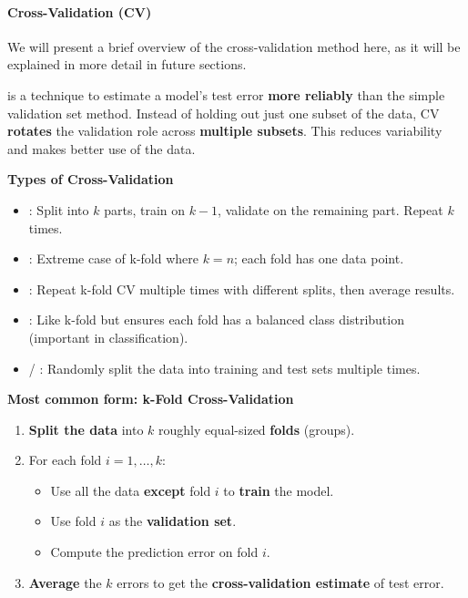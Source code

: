 \paragraph{Cross-Validation (CV)}

We will present a brief overview of the cross-validation method here, as it will be explained in more detail in future sections.

\highspace
{} is a technique to estimate a model's test error \textbf{more reliably} than the simple validation set method. Instead of holding out just one subset of the data, CV \textbf{rotates} the validation role across \textbf{multiple subsets}. This reduces variability and makes better use of the data.

\highspace
\begin{flushleft}
    \textcolor{Green3}{ \textbf{Types of Cross-Validation}}
\end{flushleft}
\begin{itemize}
    \item {}: Split into $k$ parts, train on $k - 1$, validate on the remaining part. Repeat $k$ times.
    \item {}: Extreme case of k-fold where $k = n$; each fold has one data point.
    \item {}: Repeat k-fold CV multiple times with different splits, then average results.
    \item {}: Like k-fold but ensures each fold has a balanced class distribution (important in classification).
    \item {} / : Randomly split the data into training and test sets multiple times.
\end{itemize}

\highspace
\begin{flushleft}
    \textcolor{Green3}{ \textbf{Most common form: k-Fold Cross-Validation}}
\end{flushleft}
\begin{enumerate}
    \item \textbf{Split the data} into $k$ roughly equal-sized \textbf{folds} (groups).
    \item For each fold $i = 1, \dots, k$:
    \begin{itemize}
        \item Use all the data \textbf{except} fold $i$ to \textbf{train} the model.
        \item Use fold $i$ as the \textbf{validation set}.
        \item Compute the prediction error on fold $i$.
    \end{itemize}
    \item \textbf{Average} the $k$ errors to get the \textbf{cross-validation estimate} of test error.
\end{enumerate}

